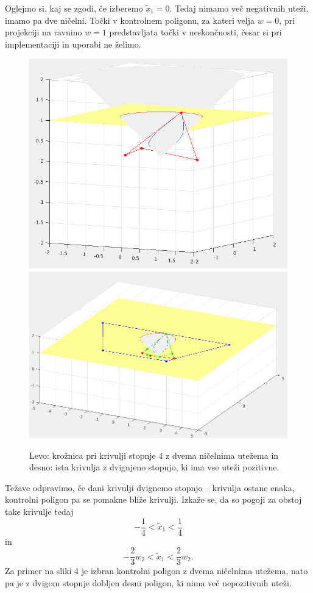\documentclass[a4paper,12pt]{article}
\begin{document}
Oglejmo si, kaj se zgodi, če izberemo $\tilde{x}_1=0$. Tedaj nimamo več negativnih uteži, imamo pa dve ničelni. Točki v kontrolnem poligonu, za kateri velja $w=0$, pri projekciji na ravnino $w=1$ predstavljata točki v neskončnosti, česar si pri implementaciji in uporabi ne želimo.
\begin{figure}[h]
\includegraphics[scale=0.24]{nicelneutezi.png}
\includegraphics[scale=0.24]{kvinticna.png}
\centering
\caption{Levo: krožnica pri krivulji stopnje 4 z dvema ničelnima utežema in desno: ista krivulja z dvignjeno stopnjo, ki ima vse uteži pozitivne.}
\end{figure}
Težave odpravimo, če dani krivulji dvignemo stopnjo -- krivulja ostane enaka, kontrolni poligon pa se pomakne bliže krivulji. Izkaže se, da so pogoji za obstoj take krivulje tedaj $$-\frac{1}{4} < \tilde{x}_1 < \frac{1}{4}$$ in $$-\frac{2}{3}w_2 < \tilde{x}_1 <  \frac{2}{3}w_2.$$
Za primer na sliki 4 je izbran kontrolni poligon z dvema ničelnima utežema, nato pa je z dvigom stopnje dobljen desni poligon, ki nima več nepozitivnih uteži.
\end{document}
